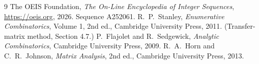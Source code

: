 \documentclass[11pt,a4paper]{article}
\theoremstyle{plain}
\theoremstyle{definition}
\begin{document}
\begin{thebibliography}{9}
 The OEIS Foundation, \emph{The On-Line Encyclopedia of Integer
Sequences}, \url{https://oeis.org}, 2026. Sequence A252061.
 R.~P.~Stanley, \emph{Enumerative Combinatorics}, Volume 1, 2nd ed.,
Cambridge University Press, 2011. (Transfer-matrix method, Section 4.7.)
 P.~Flajolet and R.~Sedgewick, \emph{Analytic Combinatorics}, Cambridge
University Press, 2009.
 R.~A.~Horn and C.~R.~Johnson, \emph{Matrix Analysis}, 2nd ed., Cambridge
University Press, 2013.
\end{thebibliography}
\end{document}
